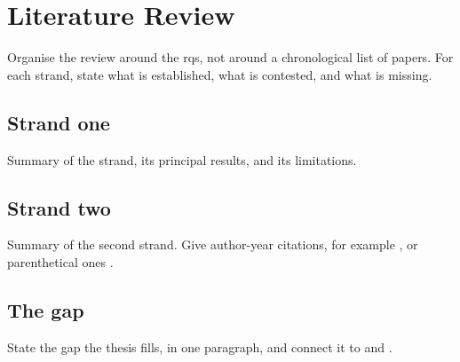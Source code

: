 \chapter{Literature Review}
\label{ch:literature}

Organise the review around the \glspl{rq}, not around a chronological list
of papers. For each strand, state what is established, what is contested,
and what is missing.

\section{Strand one}

Summary of the strand, its principal results, and its limitations.

\section{Strand two}

Summary of the second strand. Give author-year citations, for example
\autocite{helbing2000}, or parenthetical ones \parencite{bonabeau2002}.

\section{The gap}

State the gap the thesis fills, in one paragraph, and connect it to
\rqone{} and \rqtwo{}.
